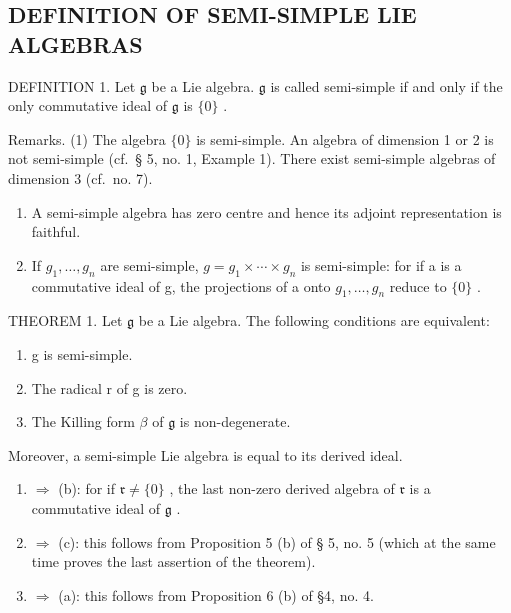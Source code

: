 \subsection{DEFINITION OF SEMI-SIMPLE LIE ALGEBRAS}

DEFINITION 1. Let \(\mathfrak{g}\) be a Lie algebra. \(\mathfrak{g}\) is called semi-simple if and only if the only commutative ideal of \(\mathfrak{g}\) is \(\{0\}\) .

Remarks. (1) The algebra \(\{0\}\) is semi-simple. An algebra of dimension 1 or 2 is not semi-simple (cf.~§ 5, no. 1, Example 1). There exist semi-simple algebras of dimension 3 (cf.~no. 7).

\begin{enumerate}
\def\labelenumi{(\arabic{enumi})}
\setcounter{enumi}{1}
\item
  A semi-simple algebra has zero centre and hence its adjoint representation is faithful.
\item
  If \(g_{1}, \ldots, g_{n}\) are semi-simple, \(g = g_{1} \times \cdots \times g_{n}\) is semi-simple: for if a is a commutative ideal of g, the projections of a onto \(g_{1}, \ldots, g_{n}\) reduce to \(\{0\}\) .
\end{enumerate}

THEOREM 1. Let \(\mathfrak{g}\) be a Lie algebra. The following conditions are equivalent:

\begin{enumerate}
\def\labelenumi{(\alph{enumi})}
\item
  g is semi-simple.
\item
  The radical r of g is zero.
\item
  The Killing form \(\beta\) of \(\mathfrak{g}\) is non-degenerate.
\end{enumerate}

Moreover, a semi-simple Lie algebra is equal to its derived ideal.

\begin{enumerate}
\def\labelenumi{(\alph{enumi})}
\item
  \(\Rightarrow\) (b): for if \(\mathfrak{r} \neq \{0\}\) , the last non-zero derived algebra of \(\mathfrak{r}\) is a commutative ideal of \(\mathfrak{g}\) .
\item
  \(\Rightarrow\) (c): this follows from Proposition 5 (b) of § 5, no. 5 (which at the same time proves the last assertion of the theorem).
\item
  \(\Rightarrow\) (a): this follows from Proposition 6 (b) of §4, no. 4.
\end{enumerate}

